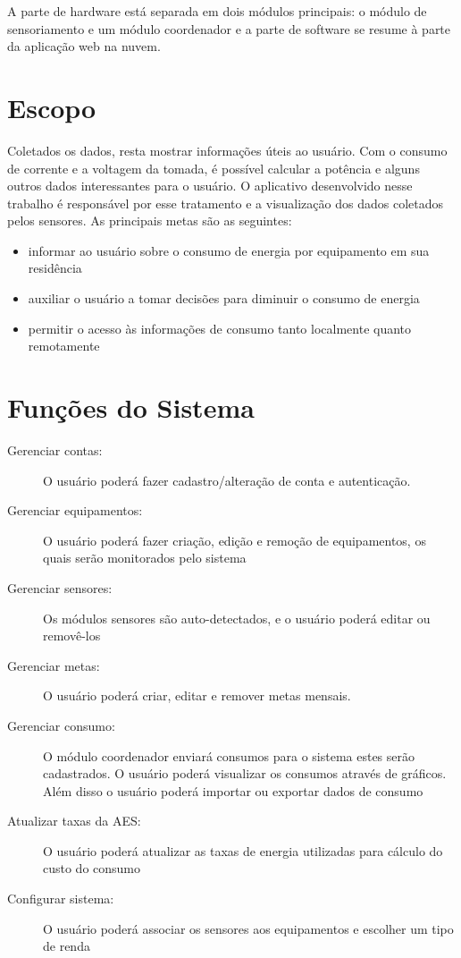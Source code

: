 A parte de hardware está separada em dois módulos principais: o módulo de sensoriamento e um módulo coordenador e a parte de software se resume à parte da aplicação web na nuvem.

\section{Escopo}

Coletados os dados, resta mostrar informações úteis ao usuário. Com o consumo de corrente e a voltagem da tomada, é possível calcular a potência e alguns outros dados interessantes para o usuário. O aplicativo desenvolvido nesse trabalho é responsável por esse tratamento e a visualização dos dados coletados pelos sensores. As principais metas são as seguintes:

\begin{itemize}
	\item{informar ao usuário sobre o consumo de energia por equipamento em sua residência}
	\item{auxiliar o usuário a tomar decisões para diminuir o consumo de energia}
  \item{permitir o acesso às informações de consumo tanto localmente quanto remotamente}
\end{itemize}
%
\section{Funções do Sistema}

\begin{description}
	\item[Gerenciar contas:] O usuário poderá fazer cadastro/alteração de conta e autenticação.
	\item[Gerenciar equipamentos:] O usuário poderá fazer criação, edição e remoção de equipamentos, os quais serão monitorados pelo sistema
	\item[Gerenciar sensores:] Os módulos sensores são auto-detectados, e o usuário poderá editar ou removê-los
	\item[Gerenciar metas:] O usuário poderá criar, editar e remover metas mensais.
	\item[Gerenciar consumo:] O módulo coordenador enviará consumos para o sistema estes serão cadastrados. O usuário poderá visualizar os consumos através de gráficos. Além disso o usuário poderá importar ou exportar dados de consumo
	\item[Atualizar taxas da AES:] O usuário poderá atualizar as taxas de energia utilizadas para cálculo do custo do consumo
	\item[Configurar sistema:] O usuário poderá associar os sensores aos equipamentos e escolher um tipo de renda
\end{description}

